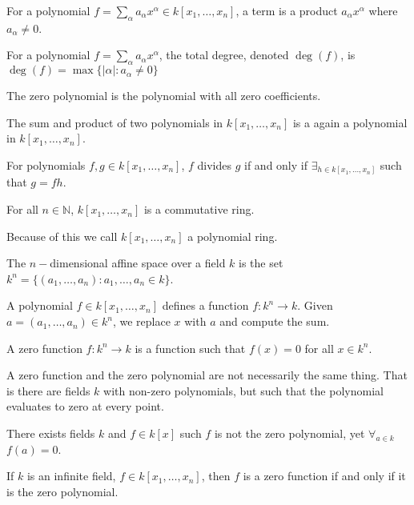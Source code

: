 \documentclass[../main.tex]{subfiles}
\begin{document}
%
\begin{definition}
For a polynomial $f=\sum_{\alpha} a_\alpha x^\alpha \in k[x_1,\hdots ,x_n]$, a term is a product $a_\alpha x^\alpha$ where $a_\alpha \ne 0$.
\end{definition}
%
\begin{definition}
For a polynomial $f=\sum_{\alpha}a_\alpha x^\alpha$, the total degree, denoted $\deg(f)$, is $\deg(f) = \max\{|\alpha|:a_\alpha \ne 0\}$
\end{definition}
%
\begin{definition}
The zero polynomial is the polynomial with all zero coefficients.
\end{definition}
%
\begin{theorem}
The sum and product of two polynomials in $k[x_1,\hdots ,x_n]$ is a again a polynomial in $k[x_1,\hdots ,x_n]$.
\end{theorem}
%
\begin{definition}
For polynomials $f,g\in k[x_1,\hdots ,x_n]$, $f$ divides $g$ if and only if $\exists_{h\in k[x_1,\hdots ,x_n]}$ such that $g = fh$.
\end{definition}
%
\begin{theorem}
For all $n\in \mathbb{N}$, $k[x_1,\hdots ,x_n]$ is a commutative ring.
\end{theorem}
%
\begin{remark}
Because of this we call $k[x_1,\hdots ,x_n]$ a polynomial ring.
\end{remark}
%
\begin{definition}
The $n-$dimensional affine space over a field $k$ is the set $k^n = \{(a_1,\hdots, a_n):a_1,\hdots,a_n \in k\}$.
\end{definition}
%
A polynomial $f\in k[x_1,\hdots ,x_n]$ defines a function $f:k^n \rightarrow k$. Given $a=(a_1,\hdots, a_n) \in k^n$, we replace $x$ with $a$ and compute the sum. 
%
\begin{definition}
A zero function $f:k^n \rightarrow k$ is a function such that $f(x) = 0$ for all $x\in k^n$.
\end{definition}
%
A zero function and the zero polynomial are not necessarily the same thing. That is there are fields $k$ with non-zero polynomials, but such that the polynomial evaluates to zero at every point.
%
\begin{theorem}
There exists fields $k$ and $f\in k[x]$ such $f$ is not the zero polynomial, yet $\forall_{a\in k}$ $f(a) = 0$.
\end{theorem}
%
\begin{theorem}
If $k$ is an infinite field, $f\in k[x_1,\hdots ,x_n]$, then $f$ is a zero function if and only if it is the zero polynomial.
\end{theorem}
\end{document}

